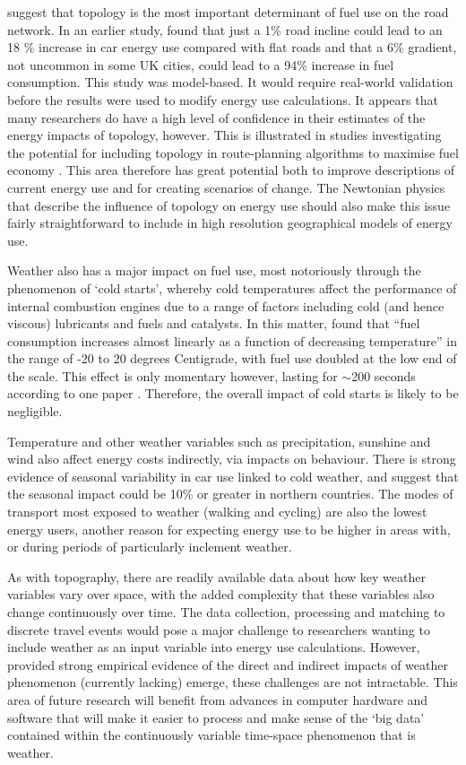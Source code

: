 \documentclass[a4paper, 11pt, twoside]{Thesis}
\begin{document}
 \citet{Park2011} suggest that topology is the most important determinant of
 fuel use on the road network. In an earlier study, \citet{park2006energy}
 found that just a 1\% road incline could lead to an 18 \% increase in
 car energy use compared with flat roads and that a 6\% gradient,
 not uncommon in some UK cities, could lead to a 94\% increase in fuel
 consumption. This study was model-based. It would require
 real-world validation before the results were used to modify energy use calculations.
 It appears that many researchers do have a high level of confidence in their
 estimates of the energy impacts of topology, however. This is illustrated in
  studies investigating the potential for including
 topology in route-planning algorithms to maximise fuel economy
 \citep{minett2011eco, ahn2011eco}. This area therefore has great potential
 both to improve descriptions of current energy use and for creating
 scenarios of change. The Newtonian physics that describe the influence of
 topology on energy use should also make this issue fairly straightforward to
 include in high resolution geographical models of energy use.

Weather also has a major impact on fuel use, most notoriously through the
phenomenon of `cold starts', whereby cold temperatures affect the performance
of internal combustion engines due to a range of factors including cold
(and hence viscous) lubricants and fuels and catalysts.
In this matter, \citet[2422]{Weilenmann2009cold} found that
``fuel consumption increases almost linearly as a function
of decreasing temperature'' in the range of -20 to 20 degrees Centigrade,
with fuel use doubled at the low end of the scale. This effect is only
momentary however, lasting for $\sim$200 seconds according to one
paper \citep{Singer1999coldstartemissions200}. Therefore, the overall impact
of cold starts is likely to be negligible.

Temperature and other weather variables such as precipitation, sunshine
and wind also affect energy costs indirectly, via impacts on behaviour.
There is strong evidence of seasonal variability in car use linked to cold
weather, and \citet{Schipper1993} suggest that the seasonal impact could be
10\% or greater in northern countries. The modes of transport most exposed to
weather (walking and cycling) are also the lowest energy users, another reason
for expecting energy use to be higher in areas with, or during periods of
particularly inclement weather.

As with topography, there are readily available data about how key weather variables
vary over space, with the added complexity that these variables also change
continuously over time. The data collection, processing and matching to
discrete travel events would pose a major challenge to
researchers wanting to include weather as an input variable into energy use
calculations. However, provided strong empirical evidence of the
direct and indirect impacts of weather phenomenon (currently lacking) emerge,
these challenges are not intractable. This area of future research will
benefit from advances in computer hardware and software that will make it
easier to process and make sense of the `big data' contained within
the continuously variable time-space phenomenon that is weather.
\end{document}
